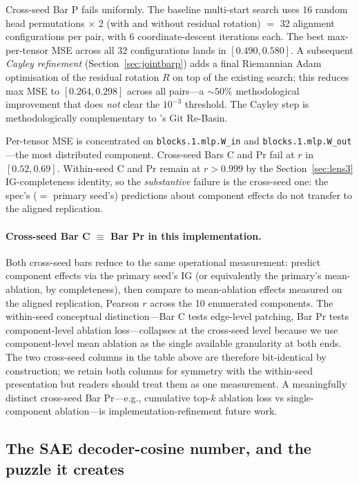\documentclass[11pt,letterpaper]{article}
\newcommand{\R}{R}
\begin{document}
Cross-seed Bar P fails uniformly. The baseline multi-start search uses 16 random head permutations $\times$ 2 (with and without residual rotation) $=$ 32 alignment configurations per pair, with 6 coordinate-descent iterations each. The best max-per-tensor MSE across all 32 configurations lands in $[0.490, 0.580]$. A subsequent \emph{Cayley refinement} (Section~\ref{sec:jointbarp}) adds a final Riemannian Adam \citep{becigneul2019riemannian} optimisation of the residual rotation $\R$ on top of the existing search; this reduces max MSE to $[0.264, 0.298]$ across all pairs---a ${\sim}50\%$ methodological improvement that does \emph{not} clear the $10^{-3}$ threshold. The Cayley step is methodologically complementary to \citet{ainsworth2023git}'s Git Re-Basin.

Per-tensor MSE is concentrated on \texttt{blocks.1.mlp.W\_in} and \texttt{blocks.1.mlp.W\_out}---the most distributed component. Cross-seed Bars C and Pr fail at $r$ in $[0.52, 0.69]$. Within-seed C and Pr remain at $r > 0.999$ by the Section~\ref{sec:lens3} IG-completeness identity, so the \emph{substantive} failure is the cross-seed one: the spec's ($=$ primary seed's) predictions about component effects do not transfer to the aligned replication.

\paragraph{Cross-seed Bar C $\equiv$ Bar Pr in this implementation.} Both cross-seed bars reduce to the same operational measurement: predict component effects via the primary seed's IG (or equivalently the primary's mean-ablation, by completeness), then compare to mean-ablation effects measured on the aligned replication, Pearson $r$ across the 10 enumerated components. The within-seed conceptual distinction---Bar C tests edge-level patching, Bar Pr tests component-level ablation loss---collapses at the cross-seed level because we use component-level mean ablation as the single available granularity at both ends. The two cross-seed columns in the table above are therefore bit-identical by construction; we retain both columns for symmetry with the within-seed presentation but readers should treat them as one measurement. A meaningfully distinct cross-seed Bar Pr---e.g., cumulative top-$k$ ablation loss vs single-component ablation---is implementation-refinement future work.

\subsection{The SAE decoder-cosine number, and the puzzle it creates}
\end{document}
